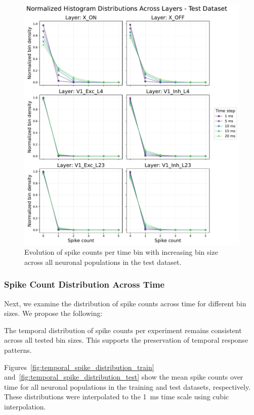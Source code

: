 \begin{figure}
    \centering
    \includegraphics[width=\linewidth]{img/plots/time_step_counts_test.pdf}
    \caption{Evolution of spike counts per time bin with increasing bin size across all neuronal populations in the test dataset.}
    \label{fig:spike_count_distribution_test}
\end{figure}


\subsubsection{Spike Count Distribution Across Time}
\label{subsubsec:spike_time_distribution}
Next, we examine the distribution of spike counts across time for different bin sizes. We propose the following:

\begin{claim}
    The temporal distribution of spike counts per experiment remains consistent across all tested bin sizes. This supports the preservation of temporal response patterns.
\end{claim}

Figures~\ref{fig:temporal_spike_distribution_train} and~\ref{fig:temporal_spike_distribution_test} show the mean spike counts over time for all neuronal populations in the training and test datasets, respectively. These distributions were interpolated to the 1~ms time scale using cubic interpolation.

